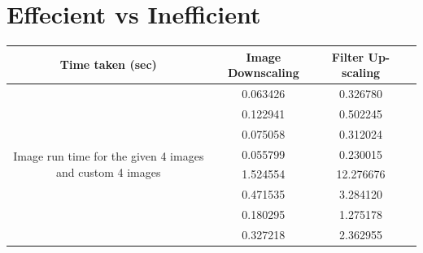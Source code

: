 \documentclass[a4paper,11pt]{article}
\begin{document}
\section*{Effecient vs Inefficient}

\begin{center}
	\begin{tabular}{ |c|c|c|c| } 
		\hline
		Time taken (sec) & Image Downscaling & Filter Up-scaling \\
		\hline
		\multirow{8}{7em}{Image run time for the given 4 images and custom 4 images} & 0.063426 & 0.326780 \\ 
		& 0.122941 & 0.502245  \\ 
		& 0.075058 & 0.312024 \\ 
		& 0.055799 & 0.230015 \\ 
		& 1.524554 & 12.276676 \\ 
		& 0.471535 & 3.284120 \\ 
		& 0.180295 & 1.275178 \\
		& 0.327218 & 2.362955 \\
		\hline
	\end{tabular}
\end{center}
\end{document}
